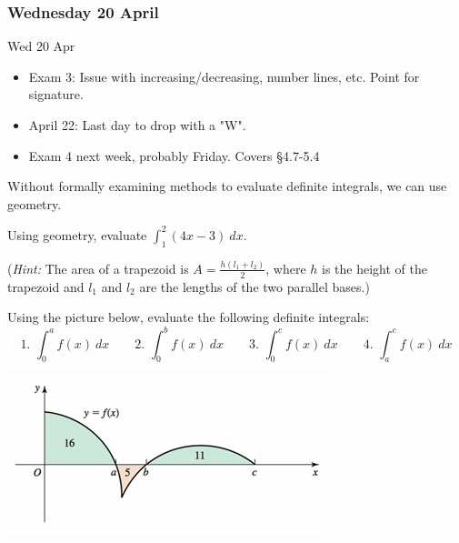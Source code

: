 \documentclass[cal1spr16Lectures.tex]{subfiles}
\begin{document}

\subsubsection{\bf Wednesday 20 April}

\begin{frame}[allowframebreaks]{Wed 20 Apr}
\begin{itemize}
\item Exam 3: Issue with increasing/decreasing, number lines, etc.  Point for signature.
\item April 22: Last day to drop with a "W".
\item Exam 4 next week, probably Friday.  Covers \S 4.7-5.4
\end{itemize}
\end{frame}

\begin{frame}\small
Without formally examining methods to evaluate definite integrals, we can use geometry.
\begin{exe} 
Using geometry, evaluate $\int_1^2 (4x-3)\ dx$. 

\vspace{0.5pc}
(\emph{Hint:}  The area of a trapezoid is $A=\frac{h(l_1+l_2)}{2}$, where $h$ is the height of the trapezoid and $l_1$ and $l_2$ are the lengths of the two parallel bases.)
\end{exe}
\end{frame}

\begin{frame}\footnotesize
\begin{exe} 
Using the picture below, evaluate the following definite integrals:
\[\text{1.\ } \int_0^a f(x)\ dx \qquad \text{2.\ } \int_0^b f(x)\ dx \qquad \text{3.\ } \int_0^c f(x)\ dx \qquad \text{4.\ } \int_a^c f(x)\ dx\]
\vspace{-2pc}

\begin{center}
\includegraphics[scale=0.8]{pictures/Ch5Sect2_Exer31}
\end{center}
\end{exe}
\end{frame}
\end{document}
